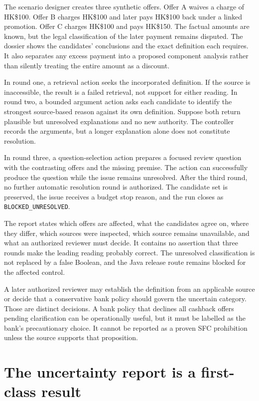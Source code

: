 \documentclass[12pt,a4paper,oneside,openany]{book}
\begin{document}
The scenario designer creates three synthetic offers. Offer A waives a charge of
HK\$100. Offer B charges HK\$100 and later pays HK\$100 back under a linked
promotion. Offer C charges HK\$100 and pays HK\$150. The factual amounts are known,
but the legal classification of the later payment remains disputed. The dossier
shows the candidates' conclusions and the exact definition each requires. It
also separates any excess payment into a proposed component analysis rather than
silently treating the entire amount as a discount.

In round one, a retrieval action seeks the incorporated definition. If the source
is inaccessible, the result is a failed retrieval, not support for either
reading. In round two, a bounded argument action asks each candidate to identify
the strongest source-based reason against its own definition. Suppose both
return plausible but unresolved explanations and no new authority. The controller
records the arguments, but a longer explanation alone does not constitute
resolution.

In round three, a question-selection action prepares a focused review question
with the contrasting offers and the missing premise. The action can successfully
produce the question while the issue remains unresolved. After the third round,
no further automatic resolution round is authorized. The candidate set is
preserved, the issue receives a budget stop reason, and the run closes as
\texttt{BLOCKED\_UNRESOLVED}.

The report states which offers are affected, what the candidates agree on, where
they differ, which sources were inspected, which source remains unavailable, and
what an authorized reviewer must decide. It contains no assertion that three
rounds make the leading reading probably correct. The unresolved classification
is not replaced by a false Boolean, and the Java release route remains blocked
for the affected control.

A later authorized reviewer may establish the definition from an applicable
source or decide that a conservative bank policy should govern the uncertain
category. Those are distinct decisions. A bank policy that declines all cashback
offers pending clarification can be operationally useful, but it must be labelled
as the bank's precautionary choice. It cannot be reported as a proven SFC
prohibition unless the source supports that proposition.

\section{The uncertainty report is a first-class result}
\label{merge:M06:22}
\end{document}
